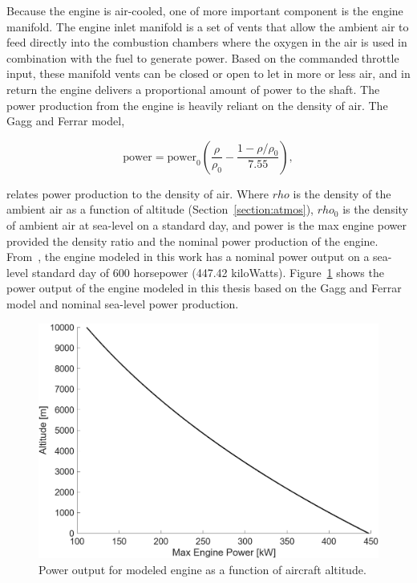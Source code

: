 \documentclass[12pt]{report}
\begin{document}
Because the engine is air-cooled, one of more important component is the engine manifold. The engine inlet manifold is a set of vents that allow the ambient air to feed directly into the combustion chambers where the oxygen in the air is used in combination with the fuel to generate power. Based on the commanded throttle input, these manifold vents can be closed or open to let in more or less air, and in return the engine delivers a proportional amount of power to the shaft. The power production from the engine is heavily reliant on the density of air. The Gagg and Ferrar model,

\begin{equation}\label{eq:gaggandferrar}
  \textrm{power} = \textrm{power}_{0}\left(\frac{\rho}{\rho_0} - \frac{1 - \rho/\rho_0}{7.55}\right),
\end{equation}

relates power production to the density of air. Where \(rho\) is the density of the ambient air as a function of altitude (Section~\ref{section:atmos}), \(rho_0\) is the density of ambient air at sea-level on a standard day, and \(\textrm{power}\) is the max engine power provided the density ratio and the nominal power production of the engine. From~\cite{1590000APdf}, the engine modeled in this work has a nominal power output on a sea-level standard day of 600 horsepower (447.42 kiloWatts). Figure~\ref{fig:gaggferrar} shows the power output of the engine modeled in this thesis based on the Gagg and Ferrar model and nominal sea-level power production.

\begin{figure}[!ht]\label{fig:gaggferrar}
  \centering
  \includegraphics[width=0.85\linewidth]{Figures/gaggferrar.png}
  \caption{Power output for modeled engine as a function of aircraft altitude.}
\end{figure}
\end{document}
